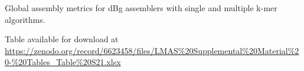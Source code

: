 \begin{table}[]
\centering
\caption{Global assembly metrics for dBg assemblers with single and multiple k-mer algorithms.}
\label{tab:ch5_suptable21}
Table available for download at \url{https://zenodo.org/record/6623458/files/LMAS\%20Supplemental\%20Material\%20-\%20Tables_Table\%20S21.xlsx}
\end{table}